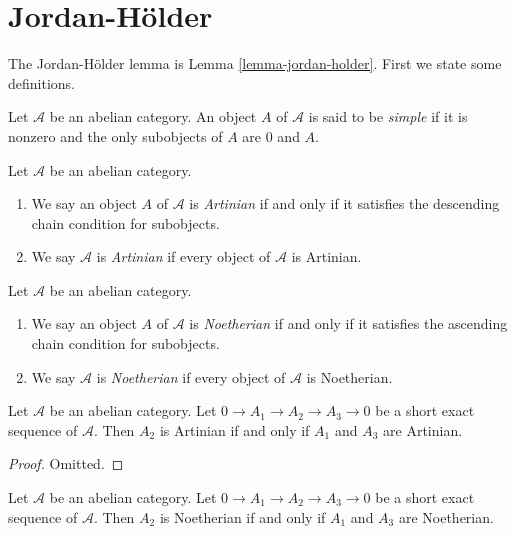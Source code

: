 \section{Jordan-H\"older}
\label{section-jordan-holder}

\noindent
The Jordan-H\"older lemma is Lemma \ref{lemma-jordan-holder}.
First we state some definitions.

\begin{definition}
\label{definition-simple}
Let $\mathcal{A}$ be an abelian category. An object $A$ of $\mathcal{A}$
is said to be {\it simple} if it is nonzero and the only subobjects
of $A$ are $0$ and $A$.
\end{definition}

\begin{definition}
\label{definition-Artinian}
Let $\mathcal{A}$ be an abelian category.
\begin{enumerate}
\item We say an object $A$ of $\mathcal{A}$ is {\it Artinian} if and only if
it satisfies the descending chain condition for subobjects.
\item We say $\mathcal{A}$ is {\it Artinian} if every object of
$\mathcal{A}$ is Artinian.
\end{enumerate}
\end{definition}

\begin{definition}
\label{definition-Noetherian}
Let $\mathcal{A}$ be an abelian category.
\begin{enumerate}
\item We say an object $A$ of $\mathcal{A}$ is {\it Noetherian} if and only if
it satisfies the ascending chain condition for subobjects.
\item We say $\mathcal{A}$ is {\it Noetherian} if every object of
$\mathcal{A}$ is Noetherian.
\end{enumerate}
\end{definition}

\begin{lemma}
\label{lemma-ses-artinian}
Let $\mathcal{A}$ be an abelian category. Let $0 \to A_1 \to A_2 \to A_3 \to 0$
be a short exact sequence of $\mathcal{A}$. Then $A_2$ is Artinian
if and only if $A_1$ and $A_3$ are Artinian.
\end{lemma}

\begin{proof}
Omitted.
\end{proof}

\begin{lemma}
\label{lemma-ses-noetherian}
Let $\mathcal{A}$ be an abelian category. Let $0 \to A_1 \to A_2 \to A_3 \to 0$
be a short exact sequence of $\mathcal{A}$. Then $A_2$ is Noetherian
if and only if $A_1$ and $A_3$ are Noetherian.
\end{lemma}

